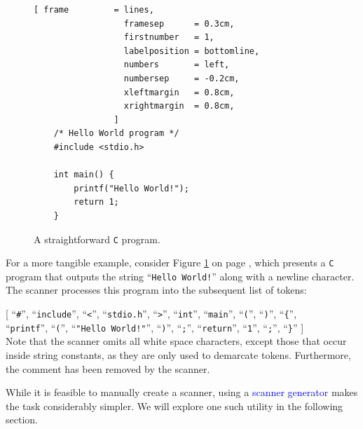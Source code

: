 \begin{figure}[!ht]
\centering
\begin{Verbatim}[ frame         = lines, 
                  framesep      = 0.3cm, 
                  firstnumber   = 1,
                  labelposition = bottomline,
                  numbers       = left,
                  numbersep     = -0.2cm,
                  xleftmargin   = 0.8cm,
                  xrightmargin  = 0.8cm,
                ]
    /* Hello World program */
    #include <stdio.h>
    
    int main() {
        printf("Hello World!");
        return 1;
    }
\end{Verbatim}
\vspace*{-0.3cm}
\caption{A straightforward \texttt{C} program.}
\label{fig:hello-world.c}
\end{figure}

\noindent
For a more tangible example, consider Figure \ref{fig:hello-world.c} on page \pageref{fig:hello-world.c}, which
presents a \texttt{C} program that outputs the string ``\texttt{Hello World!}'' along with a newline
character. The scanner processes this program into the subsequent list of tokens:
\pagebreak

\noindent
\hspace*{1.3cm}
   [ ``\texttt{\#}'', ``\texttt{include}'', ``\texttt{<}'', ``\texttt{stdio.h}'', ``\texttt{>}'',
   ``\texttt{int}'', ``\texttt{main}'', ``\texttt{(}'', ``\texttt{)}'', ``\texttt{\{}'',
\\
\hspace*{1.4cm} 
     ``\texttt{printf}'', ``\texttt{(}'', ``\texttt{"Hello World!"}'', ``\texttt{)}'', ``\texttt{;}'', ``\texttt{return}'', ``\texttt{1}'', ``\texttt{;}'', ``\texttt{\}}''
   ]
   \\[0.2cm]
Note that the scanner omits all white space characters, except those that occur inside string constants, as
they are only used to demarcate tokens.  Furthermore, the comment has been removed by the scanner.

While it is feasible to manually create a scanner, using a \textcolor{blue}{scanner generator} makes the task
considerably simpler. We will explore one such utility in the following section. 

